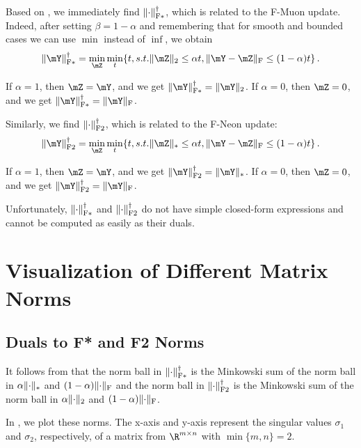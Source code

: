 \documentclass[pmlr]{jmlr}%
\DeclarePairedDelimiter{\normf}{\|}{\|_\mathrm{F}}
\DeclarePairedDelimiter{\norms}{\|}{\|_{\mathrm{2}}}
\DeclarePairedDelimiter{\normn}{\|}{\|_{*}}
\DeclarePairedDelimiter{\normfstar}{\|}{\|_\mathrm{F*}}
\DeclarePairedDelimiter{\normftwo}{\|}{\|_\mathrm{F2}}
\begin{document}
 Based on , we immediately find $\normfstar{\cdot}^\dagger$, which is related to the F-Muon update. Indeed, after setting $\beta=1-\alpha$ and remembering that for smooth and bounded cases we can use $\min$ instead of $\inf$, we obtain
 \begin{equation}\label{eq:normfstardual}
   \normfstar{\mY}^\dagger = \min_{\mZ} \min_t\{t, s.t. \norms{\mZ}\leq \alpha t, \normf{\mY-\mZ}\leq (1-\alpha) t\}\,.
 \end{equation}
 
 If $\alpha = 1$, then $\mZ = \mY$, and we get $\normfstar{\mY}^\dagger = \norms{\mY}$. If $\alpha = 0$, then $\mZ = 0$, and we get $\normfstar{\mY}^\dagger = \normf{\mY}$.
 
 Similarly, we find $\normftwo{\cdot}^\dagger$, which is related to the F-Neon update:
 \begin{equation}\label{eq:normftwodual}
   \normftwo{\mY}^\dagger = \min_{\mZ} \min_t\{t, s.t. \normn{\mZ}\leq \alpha t, \normf{\mY-\mZ}\leq (1-\alpha) t\}\,.
 \end{equation}
 
 If $\alpha = 1$, then $\mZ = \mY$, and we get $\normftwo{\mY}^\dagger = \normn{\mY}$. If $\alpha = 0$, then $\mZ = 0$, and we get $\normftwo{\mY}^\dagger = \normf{\mY}$.
 
 Unfortunately, $\normfstar{\cdot}^\dagger$ and $\normftwo{\cdot}^\dagger$ do not have simple closed-form expressions and cannot be computed as easily as their duals.
 
 \section{Visualization of Different Matrix Norms}
 \subsection{Duals to F* and F2 Norms}
 
 It follows from  that the norm ball in $\normfstar{\cdot}^\dagger$ is the Minkowski sum of the norm ball in $\alpha\normn{\cdot}$ and $(1-\alpha)\normf{\cdot}$ and the norm ball in $\normftwo{\cdot}^\dagger$ is the Minkowski sum of the norm ball in $\alpha\norms{\cdot}$ and $(1-\alpha)\normf{\cdot}$.
 
 In , we plot these norms. The x-axis and y-axis represent the singular values $\sigma_1$ and $\sigma_2$, respectively, of a matrix from $\R^{m\times n}$ with $\min\{m,n\}=2$.
 
\end{document}
